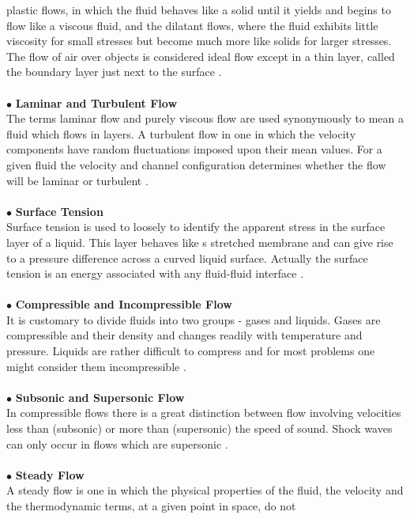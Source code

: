 plastic flows, in which the fluid behaves like a solid until it yields
and begins to flow like a viscous fluid, and the dilatant flows, where
the fluid exhibits little viscosity for small stresses but become much
more like solids for larger stresses.  The flow of air over objects
is considered ideal flow except in a thin layer, called the boundary
layer just next to the surface \cite{hughes}.
\\\\
\noindent $\bullet$ \textbf{Laminar and Turbulent Flow} \\
The terms laminar flow and purely viscous flow are used synonymously to 
mean a fluid which flows in layers. A turbulent flow in one in which the 
velocity components have random fluctuations imposed upon their mean 
values.  For a given fluid the velocity and channel configuration 
determines whether the flow will be laminar or turbulent \cite{hughes}.      
\\\\
\noindent $\bullet$ \textbf{Surface Tension} \\
Surface tension is used to loosely to identify the apparent stress in the
surface layer of a liquid.  This layer behaves like s stretched membrane
and can give rise to a pressure difference across a curved liquid surface.
Actually the surface tension is an energy associated with any fluid-fluid
interface \cite{hughes}.
\\\\
\noindent $\bullet$ \textbf{Compressible and Incompressible Flow} \\
It is customary to divide fluids into two groups - gases and liquids.
Gases are compressible and their density and changes readily with 
temperature and pressure.  Liquids are rather difficult to compress and
for most problems one might consider them incompressible \cite{hughes}.
\\\\  
\noindent $\bullet$ \textbf{Subsonic and Supersonic Flow} \\
In compressible flows there is a great distinction between flow involving
velocities less than (subsonic) or more than (supersonic) the speed of
sound.  Shock waves can only occur in flows which are supersonic 
\cite{hughes}.   
\\\\
\noindent $\bullet$ \textbf{Steady Flow} \\
A steady flow is one in which the physical properties of the fluid, the
velocity and the thermodynamic terms, at a given point in space, do not
